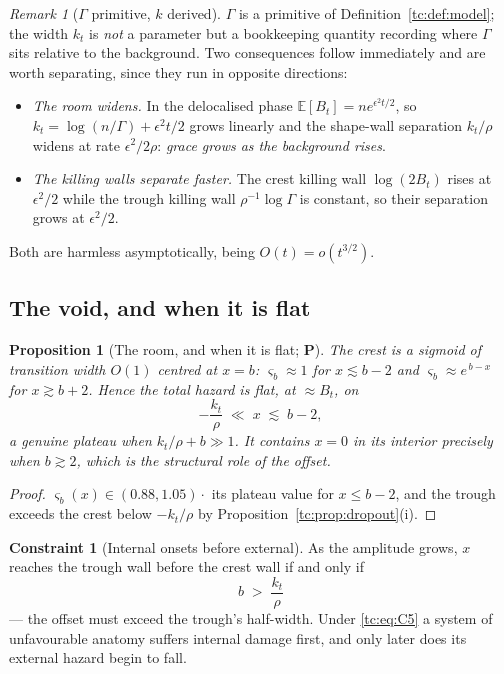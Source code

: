 \documentclass[11pt]{article}
\numberwithin{equation}{section}
\theoremstyle{plain}
\newtheorem{proposition}[theorem]{Proposition}
\theoremstyle{definition}
\newtheorem{constraint}{Constraint}
\theoremstyle{remark}
\newtheorem{remark}[theorem]{Remark}
\newcommand{\E}{\mathbb{E}}
\begin{document}
\begin{remark}[$\Gamma$ primitive, $k$ derived]\label{tc:rem:kderived}
$\Gamma$ is a primitive of Definition~\ref{tc:def:model}; the width
$k_t$ is \emph{not} a parameter but a bookkeeping quantity recording
where $\Gamma$ sits relative to the background. Two consequences follow
immediately and are worth separating, since they run in opposite
directions:
\begin{itemize}[itemsep=1pt]
\item \emph{The room widens.} In the delocalised phase
$\E[B_t]=ne^{\epsilon^{2}t/2}$, so $k_t=\log(n/\Gamma)+\epsilon^{2}t/2$
grows linearly and the shape-wall separation $k_t/\rho$ widens at rate
$\epsilon^{2}/2\rho$: \emph{grace grows as the background rises}.
\item \emph{The killing walls separate faster.} The crest killing wall
$\log(2B_t)$ rises at $\epsilon^{2}/2$ while the trough killing wall
$\rho^{-1}\log\Gamma$ is constant, so their separation grows at
$\epsilon^{2}/2$.
\end{itemize}
Both are harmless asymptotically, being $O(t)=o(t^{3/2})$.
\end{remark}

\subsection{The void, and when it is flat}\label{tc:subsub:void}

\begin{proposition}[The room, and when it is flat; \textbf{P}]
\label{tc:prop:flat}
The crest is a sigmoid of transition width $O(1)$ centred at $x=b$:
$\varsigma_b\approx1$ for $x\lesssim b-2$ and $\varsigma_b\approx
e^{\,b-x}$ for $x\gtrsim b+2$. Hence the total hazard is flat, at
$\approx B_t$, on
\begin{equation}\label{tc:eq:flat}
-\frac{k_t}{\rho}\;\ll\;x\;\lesssim\;b-2 ,
\end{equation}
a genuine plateau when $k_t/\rho+b\gg1$. It contains $x=0$ in its
interior precisely when $b\gtrsim2$, which is the structural role of the
offset.
\end{proposition}

\begin{proof}
$\varsigma_b(x)\in(0.88,1.05)\cdot$ its plateau value for
$x\le b-2$, and the trough exceeds the crest below $-k_t/\rho$ by
Proposition~\ref{tc:prop:dropout}(i).
\end{proof}

\begin{constraint}[Internal onsets before external]\label{tc:C5}
As the amplitude grows, $x$ reaches the trough wall before the crest
wall if and only if
\begin{equation}\label{tc:eq:C5}
\boxed{\;b\;>\;\frac{k_t}{\rho}\;}
\end{equation}
--- the offset must exceed the trough's half-width. Under
\eqref{tc:eq:C5} a system of unfavourable anatomy suffers internal
damage first, and only later does its external hazard begin to fall.
\end{constraint}
\end{document}
